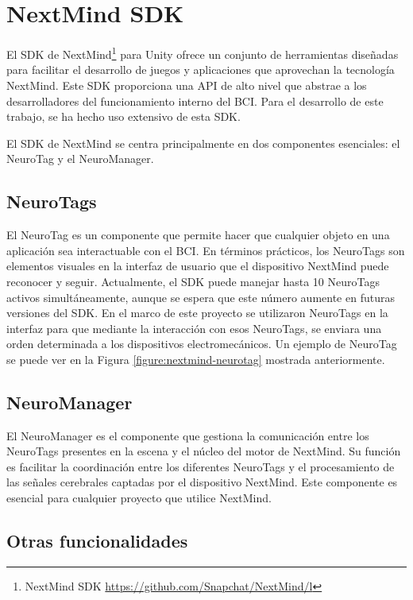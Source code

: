 \section{NextMind SDK}

El SDK de NextMind\footnote{NextMind SDK \url{https://github.com/Snapchat/NextMind/l}} para Unity ofrece un conjunto de herramientas diseñadas para facilitar el desarrollo de juegos y aplicaciones que aprovechan la tecnología NextMind. Este SDK proporciona una API de alto nivel que abstrae a los desarrolladores del funcionamiento interno del BCI. Para el desarrollo de este trabajo, se ha hecho uso extensivo de esta SDK.



El SDK de NextMind se centra principalmente en dos componentes esenciales: el NeuroTag y el NeuroManager.

\subsection{NeuroTags}
\label{subsection:NeuroTags}

El NeuroTag es un componente que permite hacer que cualquier objeto en una aplicación sea interactuable con el BCI. En términos prácticos, los NeuroTags son elementos visuales en la interfaz de usuario que el dispositivo NextMind puede reconocer y seguir. Actualmente, el SDK puede manejar hasta 10 NeuroTags activos simultáneamente, aunque se espera que este número aumente en futuras versiones del SDK. En el marco de este proyecto se utilizaron NeuroTags en la interfaz para que mediante la interacción con esos NeuroTags, se enviara una orden determinada a los dispositivos electromecánicos. Un ejemplo de NeuroTag se puede ver en la Figura \ref{figure:nextmind-neurotag} mostrada anteriormente.

\subsection{NeuroManager}
\label{subsection:NeuroManager}

El NeuroManager es el componente que gestiona la comunicación entre los NeuroTags presentes en la escena y el núcleo del motor de NextMind. Su función es facilitar la coordinación entre los diferentes NeuroTags y el procesamiento de las señales cerebrales captadas por el dispositivo NextMind. Este componente es esencial para cualquier proyecto que utilice NextMind.

\subsection{Otras funcionalidades}


